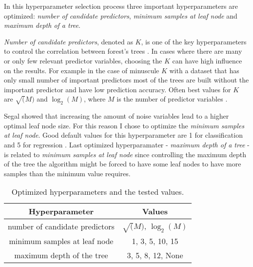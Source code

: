 In this hyperparameter selection process three important hyperparameters are optimized: \textit{number of candidate predictors}, \textit{minimum samples at leaf node} and \textit{maximum depth of a tree}.

\textit{Number of candidate predictors}, denoted as $K$, is one of the key hyperparameters to control the correlation between forest's trees \cite{probst2018hyperparameters}.
In cases where there are many or only few relevant predictor variables, choosing the $K$ can have high influence on the results. For example in the case of minuscule $K$ with a dataset that has only small number of important predictors most of the trees are built without the important predictor and have low prediction accuracy. \cite{bernard2009influence} Often best values for $K$ are $\sqrt(M)$ and $\log_2(M)$, where $M$ is the number of predictor variables \cite{bernard2009influence}.

Segal \cite{segal2004machine} showed that increasing the amount of noise variables lead to a higher optimal leaf node size. For this reason I chose to optimize the \textit{minimum samples at leaf node}. Good default values for this hyperparameter are 1 for classification and 5 for regression \cite{probst2018hyperparameters}. Last optimized hyperparamater - \textit{maximum depth of a tree} - is related to \textit{minimum samples at leaf node} since controlling the maximum depth of the tree the algorithm might be forced to have some leaf nodes to have more samples than the minimum value requires.

\begin{table}
    \caption{Optimized hyperparameters and the tested values.}
    \begin{tabular}{ | c | c |}
    \hline
    Hyperparameter & Values\\
    \hline
    number of candidate predictors & $\sqrt(M)$, $\log_2(M)$\\
    minimum samples at leaf node & 1, 3, 5, 10, 15\\
    maximum depth of the tree & 3, 5, 8, 12, None\\
    \hline
   \end{tabular}
   \label{tab:hyperparam}
\end{table}

